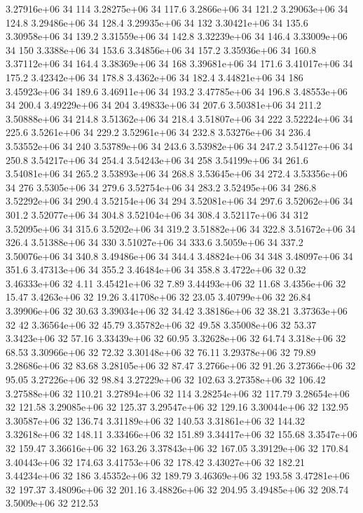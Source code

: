 3.27916e+06 34 114
3.28275e+06 34 117.6
3.2866e+06 34 121.2
3.29063e+06 34 124.8
3.29486e+06 34 128.4
3.29935e+06 34 132
3.30421e+06 34 135.6
3.30958e+06 34 139.2
3.31559e+06 34 142.8
3.32239e+06 34 146.4
3.33009e+06 34 150
3.3388e+06 34 153.6
3.34856e+06 34 157.2
3.35936e+06 34 160.8
3.37112e+06 34 164.4
3.38369e+06 34 168
3.39681e+06 34 171.6
3.41017e+06 34 175.2
3.42342e+06 34 178.8
3.4362e+06 34 182.4
3.44821e+06 34 186
3.45923e+06 34 189.6
3.46911e+06 34 193.2
3.47785e+06 34 196.8
3.48553e+06 34 200.4
3.49229e+06 34 204
3.49833e+06 34 207.6
3.50381e+06 34 211.2
3.50888e+06 34 214.8
3.51362e+06 34 218.4
3.51807e+06 34 222
3.52224e+06 34 225.6
3.5261e+06 34 229.2
3.52961e+06 34 232.8
3.53276e+06 34 236.4
3.53552e+06 34 240
3.53789e+06 34 243.6
3.53982e+06 34 247.2
3.54127e+06 34 250.8
3.54217e+06 34 254.4
3.54243e+06 34 258
3.54199e+06 34 261.6
3.54081e+06 34 265.2
3.53893e+06 34 268.8
3.53645e+06 34 272.4
3.53356e+06 34 276
3.5305e+06 34 279.6
3.52754e+06 34 283.2
3.52495e+06 34 286.8
3.52292e+06 34 290.4
3.52154e+06 34 294
3.52081e+06 34 297.6
3.52062e+06 34 301.2
3.52077e+06 34 304.8
3.52104e+06 34 308.4
3.52117e+06 34 312
3.52095e+06 34 315.6
3.5202e+06 34 319.2
3.51882e+06 34 322.8
3.51672e+06 34 326.4
3.51388e+06 34 330
3.51027e+06 34 333.6
3.5059e+06 34 337.2
3.50076e+06 34 340.8
3.49486e+06 34 344.4
3.48824e+06 34 348
3.48097e+06 34 351.6
3.47313e+06 34 355.2
3.46484e+06 34 358.8
3.4722e+06 32 0.32
3.46333e+06 32 4.11
3.45421e+06 32 7.89
3.44493e+06 32 11.68
3.4356e+06 32 15.47
3.4263e+06 32 19.26
3.41708e+06 32 23.05
3.40799e+06 32 26.84
3.39906e+06 32 30.63
3.39034e+06 32 34.42
3.38186e+06 32 38.21
3.37363e+06 32 42
3.36564e+06 32 45.79
3.35782e+06 32 49.58
3.35008e+06 32 53.37
3.3423e+06 32 57.16
3.33439e+06 32 60.95
3.32628e+06 32 64.74
3.318e+06 32 68.53
3.30966e+06 32 72.32
3.30148e+06 32 76.11
3.29378e+06 32 79.89
3.28686e+06 32 83.68
3.28105e+06 32 87.47
3.2766e+06 32 91.26
3.27366e+06 32 95.05
3.27226e+06 32 98.84
3.27229e+06 32 102.63
3.27358e+06 32 106.42
3.27588e+06 32 110.21
3.27894e+06 32 114
3.28254e+06 32 117.79
3.28654e+06 32 121.58
3.29085e+06 32 125.37
3.29547e+06 32 129.16
3.30044e+06 32 132.95
3.30587e+06 32 136.74
3.31189e+06 32 140.53
3.31861e+06 32 144.32
3.32618e+06 32 148.11
3.33466e+06 32 151.89
3.34417e+06 32 155.68
3.3547e+06 32 159.47
3.36616e+06 32 163.26
3.37843e+06 32 167.05
3.39129e+06 32 170.84
3.40443e+06 32 174.63
3.41753e+06 32 178.42
3.43027e+06 32 182.21
3.44234e+06 32 186
3.45352e+06 32 189.79
3.46369e+06 32 193.58
3.47281e+06 32 197.37
3.48096e+06 32 201.16
3.48826e+06 32 204.95
3.49485e+06 32 208.74
3.5009e+06 32 212.53
